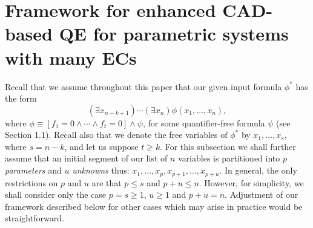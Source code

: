 \documentclass{article}
\newtheorem{definition}{Definition}
\begin{document}




\newpage

\section{Framework for enhanced CAD-based QE
            for parametric systems with many ECs}
Recall that we assume throughout this paper that our given input formula
$\phi^*$ has the form
\[(\exists x_{n-k+1}) \cdots (\exists x_n) \phi(x_1, \ldots, x_n),\]
where $\phi \equiv [f_1 = 0 \wedge \cdots \wedge f_t = 0] \wedge \psi$,
for some quantifier-free formula $\psi$ (see Section 1.1).  
Recall also that we denote the free variables of $\phi^*$ by $x_1, \ldots, x_s$,
where $s = n-k$, and let us suppose $t \ge k$.
For this subsection we shall further assume that an initial segment of
our list of $n$ variables is partitioned into $p$ {\em parameters} and
$u$ {\em unknowns} thus: $x_1, \ldots, x_p, x_{p+1}, \ldots, x_{p+u}$.
In general, the only restrictions on $p$ and $u$ are that $p \le s$ and
$p+u \le n$. However, for simplicity, we shall consider only the
case $p = s \ge 1$, $u \ge 1$ and $p+u = n$. Adjustment of our framework described below for other cases which may arise in practice would be straightforward.
\end{document}
